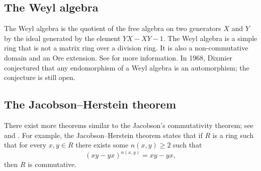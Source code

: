 

\subsection*{The Weyl algebra}

The Weyl algebra is the quotient of the free algebra on two generators
$X$ and $Y$ by the ideal generated by the element
$YX-XY-1$. The Weyl algebra is a simple ring that is 
not a matrix ring over a division ring. It is also a non-commutative domain and an Ore extension. See \cite{MR1838439} for more information. 
In 1968, Dixmier conjectured that any 
endomorphism of a Weyl algebra is an automorphism; the conjecture
is still open. 

\subsection*{The Jacobson--Herstein theorem}

There exist more theorems similar to 
the Jacobson's commutativity theorem; see \cite{MR1838439} and \cite{MR2319575}. For example, 
the Jacobson--Herstein theorem states that  
if $R$ is a ring
such that for every $x,y\in R$ there exists some
$n(x,y)\geq2$ such that 
\[
(xy-yx)^{n(x,y)}=xy-yx,
\]
then $R$ is commutative.







